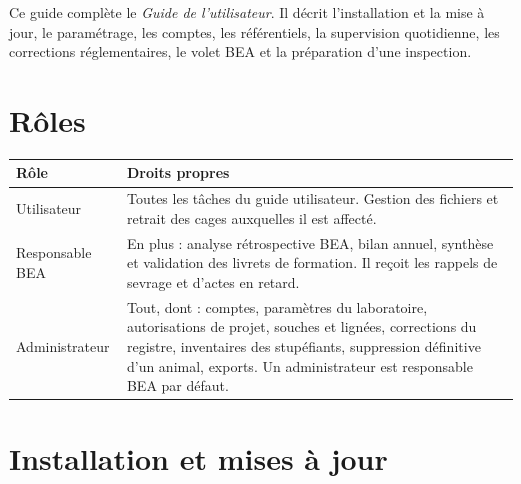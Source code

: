 \documentclass[11pt,a4paper]{article}
\begin{document}


\noindent Ce guide complète le \emph{Guide de l'utilisateur}. Il décrit
l'installation et la mise à jour, le paramétrage, les comptes, les
référentiels, la supervision quotidienne, les corrections réglementaires, le
volet BEA et la préparation d'une inspection.

\tableofcontents
\newpage

\section{Rôles}
\begin{center}
\begin{tabularx}{\textwidth}{@{}lX@{}}
\toprule
\textbf{Rôle} & \textbf{Droits propres}\\
\midrule
Utilisateur & Toutes les tâches du guide utilisateur. Gestion des fichiers et retrait des cages auxquelles il est affecté.\\
Responsable BEA & En plus : analyse rétrospective BEA, bilan annuel, synthèse et validation des livrets de formation. Il reçoit les rappels de sevrage et d'actes en retard.\\
Administrateur & Tout, dont : comptes, paramètres du laboratoire, autorisations de projet, souches et lignées, corrections du registre, inventaires des stupéfiants, suppression définitive d'un animal, exports. Un administrateur est responsable BEA par défaut.\\
\bottomrule
\end{tabularx}
\end{center}

\section{Installation et mises à jour}
\end{document}
